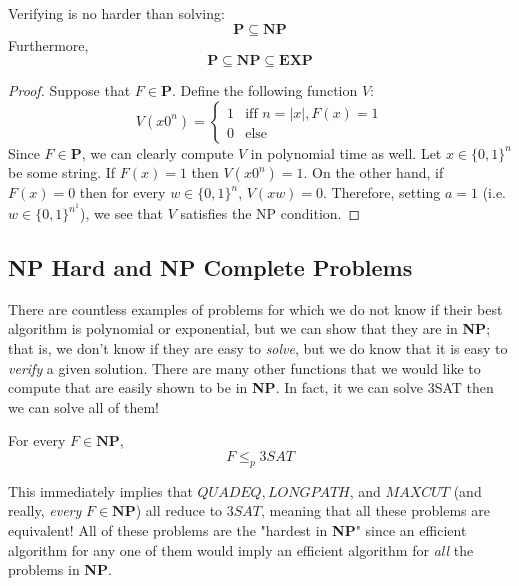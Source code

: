 \documentclass{article}
\begin{document}
  \begin{theorem}
  Verifying is no harder than solving: 
  \[\mathbf{P} \subseteq \mathbf{NP}\]
  Furthermore, 
  \[\mathbf{P} \subseteq \mathbf{NP} \subseteq \mathbf{EXP}\]
  \begin{center}
  \end{center}
  \end{theorem}
  \begin{proof}
  Suppose that $F \in \mathbf{P}$. Define the following function $V$:
  \[V (x 0^n) = \begin{cases}
  1 & \text{iff } n = |x|, F(x) = 1 \\
  0 & \text{else} 
  \end{cases}\]
  Since $F \in \mathbf{P}$, we can clearly compute $V$ in polynomial time as well. Let $x \in \{0,1\}^n$ be some string. If $F(x) = 1$ then $V(x 0^n) = 1$. On the other hand, if $F(x) = 0$ then for every $w \in \{0,1\}^n$, $V(xw) = 0$. Therefore, setting $a = 1$ (i.e. $w \in \{0,1\}^{n^1}$), we see that $V$ satisfies the NP condition. 
  \end{proof}

  \subsection{NP Hard and NP Complete Problems}
  There are countless examples of problems for which we do not know if their best algorithm is polynomial or exponential, but we can show that they are in \textbf{NP}; that is, we don't know if they are easy to \textit{solve}, but we do know that it is easy to \textit{verify} a given solution. There are many other functions that we would like to compute that are easily shown to be in \textbf{NP}. In fact, it we can solve 3SAT then we can solve all of them! 

  \begin{theorem}
  For every $F \in \mathbf{NP}$, 
  \[F \leq_p 3SAT\]
  \end{theorem}
  This immediately implies that $QUADEQ, LONGPATH$, and $MAXCUT$ (and really, \textit{every} $F \in \mathbf{NP}$) all reduce to $3SAT$, meaning that all these problems are equivalent! All of these problems are the "hardest in \textbf{NP}" since an efficient algorithm for any one of them would imply an efficient algorithm for \textit{all} the problems in \textbf{NP}. 
\end{document}

